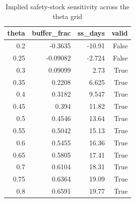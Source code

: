 \begin{table}
\caption{Implied safety-stock sensitivity across the theta grid}
\label{tab:tableS3_safety_stock_grid}
\begin{tabular}{rrrr}
\toprule
theta & buffer\_frac & ss\_days & valid \\
\midrule
0.2 & -0.3635 & -10.91 & False \\
0.25 & -0.09082 & -2.724 & False \\
0.3 & 0.09099 & 2.73 & True \\
0.35 & 0.2208 & 6.625 & True \\
0.4 & 0.3182 & 9.547 & True \\
0.45 & 0.394 & 11.82 & True \\
0.5 & 0.4546 & 13.64 & True \\
0.55 & 0.5042 & 15.13 & True \\
0.6 & 0.5455 & 16.36 & True \\
0.65 & 0.5805 & 17.41 & True \\
0.7 & 0.6104 & 18.31 & True \\
0.75 & 0.6364 & 19.09 & True \\
0.8 & 0.6591 & 19.77 & True \\
\bottomrule
\end{tabular}
\end{table}
